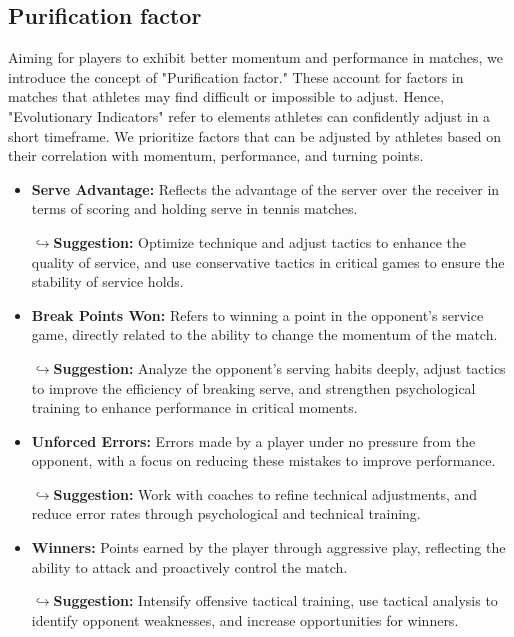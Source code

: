 \documentclass[12pt]{article}%
\begin{document}
\subsection{Purification factor}

Aiming for players to exhibit better momentum and performance in matches, we introduce the concept of "Purification factor." These account for factors in matches that athletes may find difficult or impossible to adjust. Hence, "Evolutionary Indicators" refer to elements athletes can confidently adjust in a short timeframe. We prioritize factors that can be adjusted by athletes based on their correlation with momentum, performance, and turning points.
	\begin{itemize}
	\setlength{\parsep}{0ex} %
	\setlength{\topsep}{2ex} %
	\setlength{\itemsep}{1ex} %
	\item \textbf{Serve Advantage:} Reflects the advantage of the server over the receiver in terms of scoring and holding serve in tennis matches.
	
	\textbf{$\hookrightarrow$Suggestion:} Optimize technique and adjust tactics to enhance the quality of service, and use conservative tactics in critical games to ensure the stability of service holds.
	
	\item \textbf{Break Points Won:} Refers to winning a point in the opponent's service game, directly related to the ability to change the momentum of the match.
	
	\textbf{$\hookrightarrow$Suggestion:} Analyze the opponent's serving habits deeply, adjust tactics to improve the efficiency of breaking serve, and strengthen psychological training to enhance performance in critical moments.
	
	\item \textbf{Unforced Errors:} Errors made by a player under no pressure from the opponent, with a focus on reducing these mistakes to improve performance.
	
	\textbf{$\hookrightarrow$Suggestion:} Work with coaches to refine technical adjustments, and reduce error rates through psychological and technical training.
	
	\item \textbf{Winners:}  Points earned by the player through aggressive play, reflecting the ability to attack and proactively control the match.
	
	\textbf{$\hookrightarrow$Suggestion:} Intensify offensive tactical training, use tactical analysis to identify opponent weaknesses, and increase opportunities for winners.
	

\end{itemize}
\end{document}
